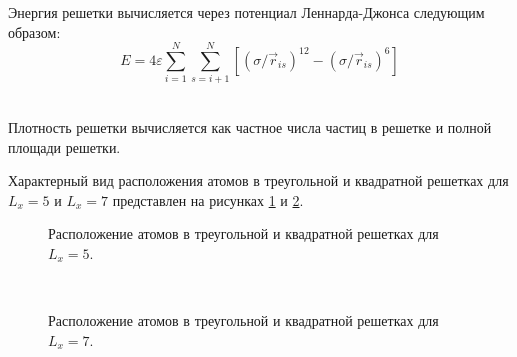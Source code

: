 \documentclass[14pt,a4paper,report]{ncc}
\begin{document}
Энергия решетки вычисляется через потенциал Леннарда-Джонса следующим образом:
\begin{equation}
E=4 \varepsilon \sum\limits_{i=1}^N \sum\limits_{s=i+1}^N{ [(\sigma/\vec{r}_{is})^{12} - (\sigma/\vec{r}_{is})^{6}  ]}
\end{equation}
\

Плотность решетки вычисляется как частное числа частиц в решетке и полной площади решетки.

Характерный вид расположения атомов в треугольной и квадратной решетках для $L_x=5$ и $L_x=7$ представлен на рисунках \ref{ris:image1} и \ref{ris:image2}. 
\begin{figure}[]
\caption{Расположение атомов в треугольной и квадратной решетках для $L_x=5$.}
\label{ris:image1}
\end{figure}
\

\begin{figure}[]
\caption{Расположение атомов в треугольной и квадратной решетках для $L_x=7$.}
\label{ris:image2}
\end{figure}
\
\end{document}

